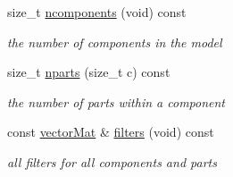 \begin{DoxyCompactItemize}
size\-\_\-t \hyperlink{classParts_a88ecd6a5e7e745e89c53f95f1593c600}{ncomponents} (void) const 
\begin{DoxyCompactList}\small\item\em the number of components in the model \end{DoxyCompactList}\item 
size\-\_\-t \hyperlink{classParts_a77d8b38212220cd8779736205388b48f}{nparts} (size\-\_\-t c) const 
\begin{DoxyCompactList}\small\item\em the number of parts within a component \end{DoxyCompactList}\item 
const \hyperlink{types_8hpp_a3207a7addcfa415d1c83622febcb1e9b}{vector\-Mat} \& \hyperlink{classParts_af3e4755656bcd59221ec3b91a79c0201}{filters} (void) const 
\begin{DoxyCompactList}\small\item\em all filters for all components and parts \end{DoxyCompactList}\end{DoxyCompactItemize}
